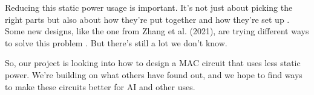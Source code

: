 Reducing this static power usage is important. It's not just about picking the right parts but also about how they're put together and how they're set up \cite{ntnudepartmentofelectronicsystems_2023_project}. Some new designs, like the one from Zhang et al. (2021), are trying different ways to solve this problem \cite{zhang_2021_a}. But there's still a lot we don't know.

So, our project is looking into how to design a MAC circuit that uses less static power. We're building on what others have found out, and we hope to find ways to make these circuits better for AI and other uses.